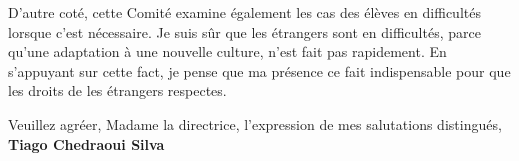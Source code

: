 \documentclass[11pt]{article}
\begin{document}
 D'autre coté, cette Comité examine également les cas des élèves en difficultés lorsque c'est nécessaire. Je suis sûr que les étrangers sont en difficultés, parce qu'une adaptation à une nouvelle culture, n'est fait pas rapidement. En s'appuyant sur cette fact, je pense que ma présence ce fait indispensable pour que les droits de les étrangers respectes.

Veuillez agréer, Madame la directrice, l'expression de mes salutations distingués,\\[2em]

%
{\bfseries Tiago Chedraoui Silva}\\
%
\vfill%
\end{document}

